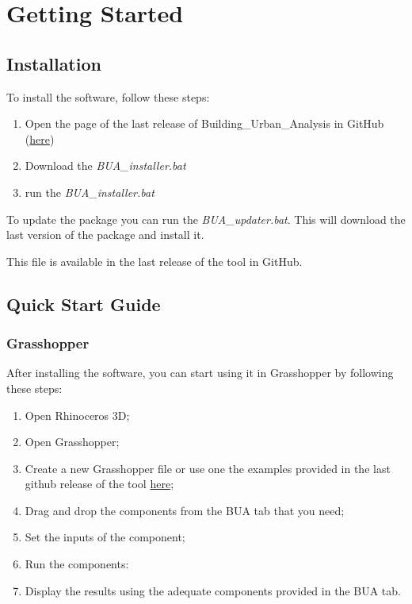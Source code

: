 \documentclass[a4paper,12pt]{article} %
\begin{document}
\section{Getting Started}
\label{sec:getting-started}

    \subsection{Installation}
    \label{subsec:installation}
    To install the software, follow these steps:
    \begin{enumerate}
        \item Open the page of the last release of Building\_Urban\_Analysis in GitHub (\href{https://github.com/Eliewiii/Building_Urban_Analysis}{here})
        \item Download the \textit{BUA\_installer.bat}
        \item run the \textit{BUA\_installer.bat}
    \end{enumerate}

    To update the package you can run the \textit{BUA\_updater.bat}.
    This will download the last version of the package and install it.

    This file is available in the last release of the tool in GitHub.

    \subsection{Quick Start Guide}
    \label{subsec:quick-start-guide}

    \subsubsection{Grasshopper}
    \label{subsubsec:quick-start-guide-grasshopper}
    After installing the software, you can start using it in Grasshopper by following these steps:
    \begin{enumerate}
        \item Open Rhinoceros 3D;
        \item Open Grasshopper;
        \item Create a new Grasshopper file or use one the examples provided in the last github release of the tool \href{https://github.com/Eliewiii/Building_Urban_Analysis/releases/latest/download/BUA_Grasshopper_example_files.zip}{here};
        \item Drag and drop the components from the BUA tab that you need;
        \item Set the inputs of the component;
        \item Run the components:
        \item Display the results using the adequate components provided in the BUA tab.
    \end{enumerate}
\end{document}
